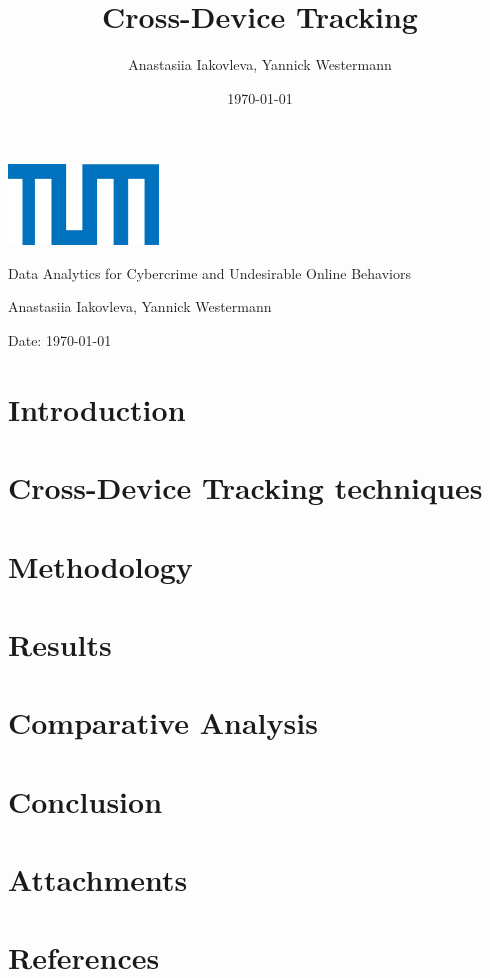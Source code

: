 \documentclass{article}
\title{Cross-Device Tracking}
\author{Anastasiia Iakovleva, Yannick Westermann}
\date{\today}
\renewcommand\maketitle{
  \begin{titlepage}
    \centering
    \includegraphics[width=0.3\textwidth]{./assets/tum-logo.png} 
    \vspace{1cm}

    \Large
    Data Analytics for Cybercrime and Undesirable Online Behaviors
    \vspace{2cm}

    \Huge
    \thetitle
    \vspace{2cm}

    \Large
    Anastasiia Iakovleva, Yannick Westermann
    \vspace{1cm}

    \normalsize
    Date: \today
    \vspace{1cm}

    \begin{abstract}
        \lipsum[1]
    \end{abstract}
  \end{titlepage}
}
\begin{document}
\maketitle

\newpage
\tableofcontents
\newpage

\section{Introduction}\label{sec:introduction}


\section{Cross-Device Tracking techniques}\label{sec:data-analytics}


\section{Methodology}\label{sec:methodology}


\section{Results}\label{sec:results}


\section{Comparative Analysis}\label{sec:discussion}


\section{Conclusion}\label{sec:conclusion}


\section{Attachments}\label{sec:attachments}


\section{References}\label{sec:references}

\end{document}
